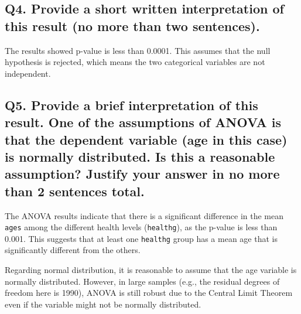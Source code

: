 \documentclass[
]{article}
\newenvironment{Shaded}{\begin{snugshade}}{\end{snugshade}}
\newcommand{\FunctionTok}[1]{\textcolor[rgb]{0.13,0.29,0.53}{\textbf{#1}}}
\newcommand{\NormalTok}[1]{#1}
\newcommand{\SpecialCharTok}[1]{\textcolor[rgb]{0.81,0.36,0.00}{\textbf{#1}}}
\begin{document}
\subsection{Q4. Provide a short written interpretation of this result
(no more than two
sentences).}\label{q4.-provide-a-short-written-interpretation-of-this-result-no-more-than-two-sentences.}

The results showed p-value is less than 0.0001. This assumes that the
null hypothesis is rejected, which means the two categorical variables
are not independent.

\begin{Shaded}
\end{Shaded}

\begin{Shaded}
\end{Shaded}

\subsection{Q5. Provide a brief interpretation of this result. One of
the assumptions of ANOVA is that the dependent variable (age in this
case) is normally distributed. Is this a reasonable assumption? Justify
your answer in no more than 2 sentences
total.}\label{q5.-provide-a-brief-interpretation-of-this-result.-one-of-the-assumptions-of-anova-is-that-the-dependent-variable-age-in-this-case-is-normally-distributed.-is-this-a-reasonable-assumption-justify-your-answer-in-no-more-than-2-sentences-total.}

The ANOVA results indicate that there is a significant difference in the
mean \texttt{ages} among the different health levels (\texttt{healthg}),
as the p-value is less than 0.001. This suggests that at least one
\texttt{healthg} group has a mean age that is significantly different
from the others.

Regarding normal distribution, it is reasonable to assume that the age
variable is normally distributed. However, in large samples (e.g., the
residual degrees of freedom here is 1990), ANOVA is still robust due to
the Central Limit Theorem even if the variable might not be normally
distributed.
\end{document}
